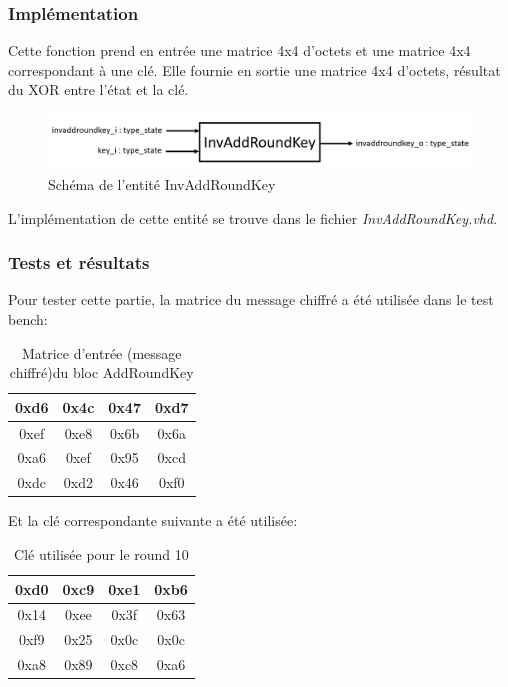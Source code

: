 \documentclass[a4paper, 12pt]{article}
\begin{document}
		\subsubsection{Implémentation}
	Cette fonction prend en entrée une matrice 4x4 d'octets et une matrice 4x4 correspondant à une clé. Elle fournie en sortie une matrice 4x4 d'octets, résultat du XOR entre l'état et la clé.
			\begin{figure}[H]
				\begin{center}
				\includegraphics[scale=0.4]{Images/InvAddRoundKeyEntity.png}
				\end{center}
				\caption{Schéma de l'entité InvAddRoundKey}
				\label{InvAddRoundKeyEntity}
			\end{figure}
	L'implémentation de cette entité se trouve dans le fichier \emph{InvAddRoundKey.vhd}.
		\subsubsection{Tests et résultats}
		Pour tester cette partie, la matrice du message chiffré a été utilisée dans le test bench: \\
			\begin{table}[H]
				\begin{center}
				\begin{tabular}{|c|c|c|c|}
					\hline
					0xd6 & 0x4c & 0x47 & 0xd7 \\
					\hline
					0xef & 0xe8 & 0x6b & 0x6a \\
					\hline
					0xa6 & 0xef & 0x95 & 0xcd \\
					\hline
					0xdc & 0xd2 & 0x46 & 0xf0 \\
					\hline
				\end{tabular}
				\caption{Matrice d'entrée (message chiffré)du bloc AddRoundKey}
				\label{MatriceMessageInvAddRoundKey}
				\end{center}
			\end{table}
			
		Et la clé correspondante suivante a été utilisée:
		\begin{table}[H]
				\begin{center}
				\begin{tabular}{|c|c|c|c|}
					\hline
					0xd0 & 0xc9 & 0xe1 & 0xb6 \\
					\hline
					0x14 & 0xee & 0x3f & 0x63 \\
					\hline
					0xf9 & 0x25 & 0x0c & 0x0c \\
					\hline
					0xa8 & 0x89 & 0xc8 & 0xa6 \\
					\hline
				\end{tabular}
				\caption{Clé utilisée pour le round 10}
				\label{MatriceCleInvAddRoundKey}
				\end{center}
			\end{table}
			
\end{document}
